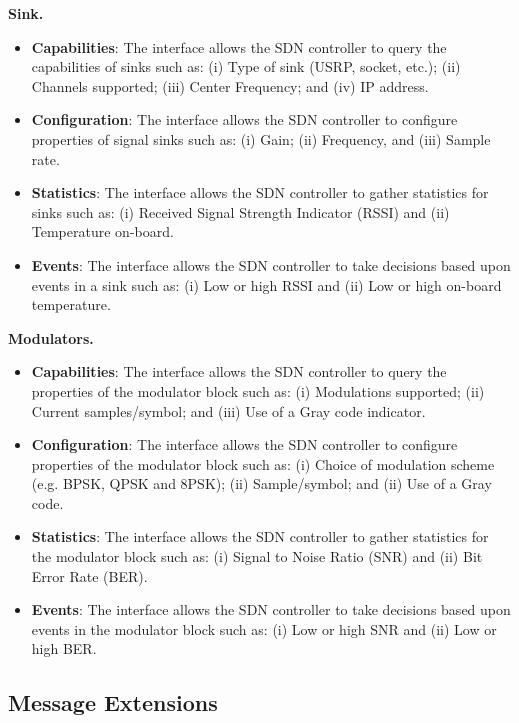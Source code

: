 \textbf{Sink.}
\begin{itemize}
\item \textbf{Capabilities}: The interface allows the SDN controller to query the capabilities of sinks such as:
    (i)  Type of sink (USRP, socket, etc.);
    (ii) Channels supported; 
    (iii) Center Frequency; and
    (iv) IP address. 
\item \textbf{Configuration}: The interface allows the SDN controller to configure properties of signal sinks such as:
    (i) Gain;
    (ii) Frequency, and
    (iii) Sample rate.
\item \textbf{Statistics}: The interface allows the SDN controller to gather statistics for sinks such as:
    (i) Received Signal Strength Indicator (RSSI) and 
    (ii) Temperature on-board.
\item \textbf{Events}: The interface allows the SDN controller to take decisions based upon events in a sink such as:
    (i) Low or high RSSI and
    (ii) Low or high on-board temperature.
\end{itemize}

\textbf{Modulators.}
\begin{itemize}
\item \textbf{Capabilities}: The interface allows the SDN controller to query the properties of the modulator block such as:
    (i) Modulations supported;
    (ii) Current samples/symbol; and 
    (iii) Use of a Gray code indicator.
\item \textbf{Configuration}: The interface allows the SDN controller to configure properties of the modulator block such as:
    (i) Choice of modulation scheme (e.g. BPSK, QPSK and 8PSK); 
    (ii) Sample/symbol; and
    (ii) Use of a Gray code.
\item \textbf{Statistics}: The interface allows the SDN controller to gather statistics for the modulator block such as:
    (i) Signal to Noise Ratio (SNR) and 
    (ii) Bit Error Rate (BER).
\item \textbf{Events}: The interface allows the SDN controller to take decisions based upon events in the modulator block such as:
    (i) Low or high SNR and
    (ii) Low or high BER.
\end{itemize}

\subsection{Message Extensions}
\label{sec:messages}
  		  
